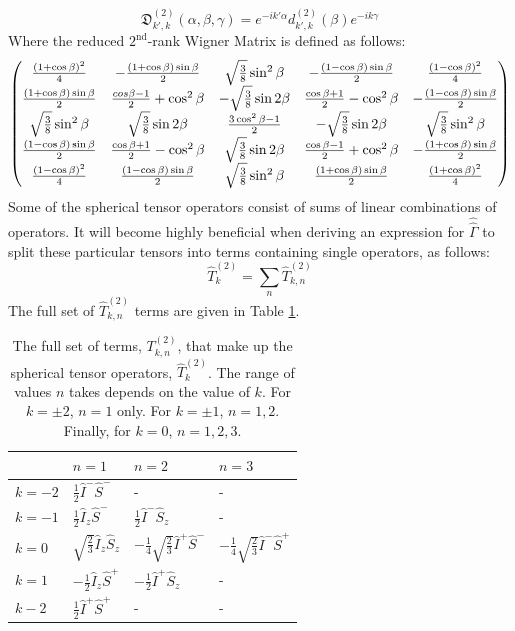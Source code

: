 \begin{equation}
\mathfrak{D}_{k{\prime},k}^{(2)}(\alpha, \beta, \gamma) = e^{-i k{\prime} \alpha} d_{k{\prime},k}^{(2)}(\beta) e^{-i k \gamma}
\end{equation}
Where the reduced $\text{2}^{\text{nd}}$-rank Wigner Matrix is defined as follows:
\begin{equation}
\label{RedWignerMatrix}
\mqty(\frac{(1 + \cos\beta)^2}{4} & -\frac{(1+\cos\beta)\sin\beta}{2} & \sqrt{\frac{3}{8}}\sin^2\beta & -\frac{(1-\cos\beta)\sin\beta}{2} & \frac{(1-\cos\beta)^2}{4} \\ \frac{(1+\cos\beta)\sin\beta}{2} & \frac{cos\beta - 1}{2} + \cos^2\beta & -\sqrt{\frac{3}{8}}\sin2\beta & \frac{\cos\beta + 1}{2} - \cos^2\beta & -\frac{(1 - \cos\beta)\sin\beta}{2} \\ \sqrt{\frac{3}{8}}\sin^2\beta & \sqrt{\frac{3}{8}}\sin2\beta & \frac{3\cos^2\beta - 1}{2} & -\sqrt{\frac{3}{8}}\sin2\beta & \sqrt{\frac{3}{8}}\sin^2\beta \\ \frac{(1 - \cos\beta)\sin\beta}{2} & \frac{\cos\beta + 1}{2} - \cos^2\beta & \sqrt{\frac{3}{8}}\sin2\beta & \frac{\cos\beta - 1}{2} + \cos^2\beta & -\frac{(1 + \cos\beta)\sin\beta}{2} \\ \frac{(1 - \cos\beta)^2}{4} & \frac{(1 - \cos\beta)\sin\beta}{2} & \sqrt{\frac{3}{8}}\sin^2\beta & \frac{(1 + \cos\beta)\sin\beta}{2} & \frac{(1 + \cos\beta)^2}{4})
\end{equation}
Some of the spherical tensor operators consist of sums of linear combinations of operators. It will become highly beneficial when deriving an expression for $\hat{\hat{\Gamma}}$ to split these particular tensors into terms containing single operators, as follows:
\begin{equation}
\hat{T}_k^{(2)} = \sum \limits_n \hat{T}_{k,n}^{(2)}
\end{equation}
The full set of $\hat{T}_{k,n}^{(2)}$ terms are given in Table \ref{SphericalOperators}.\\
\begin{table}[]
\centering
\begin{tabular}{l|lll}
       & $n = 1$ & $n = 2$ & $n = 3$ \\ \hline
$k=-2$ & $\frac{1}{2} \hat{I}^{-} \hat{S}^{-}$      & -       & -       \\
$k=-1$ & $\frac{1}{2} \hat{I}_z \hat{S}^{-}$      & $\frac{1}{2} \hat{I}^{-} \hat{S}_{z}$      & -       \\
$k=0$  & $\sqrt{\frac{2}{3}} \hat{I}_{z} \hat{S}_{z}$      & $-\frac{1}{4} \sqrt{\frac{2}{3}} \hat{I}^{+} \hat{S}^{-}$      & $-\frac{1}{4} \sqrt{\frac{2}{3}} \hat{I}^{-} \hat{S}^{+}$      \\
$k=1$  & $-\frac{1}{2} \hat{I}_z \hat{S}^{+}$      & $-\frac{1}{2} \hat{I}^{+} \hat{S}_z$      & -       \\
$k-2$  & $\frac{1}{2} \hat{I}^{+} \hat{S}^{+}$      & -       & -      
\end{tabular}
\caption{The full set of terms, $T_{k,n}^{(2)}$, that make up the spherical tensor operators, $\hat{T}_k^{(2)}$. The range of values $n$ takes depends on the value of $k$. For $k = \pm 2$, $n=1$ only. For $k = \pm 1$, $n=1, 2$. Finally, for $k = 0$, $n=1, 2, 3$.}
\label{SphericalOperators}
\end{table}
